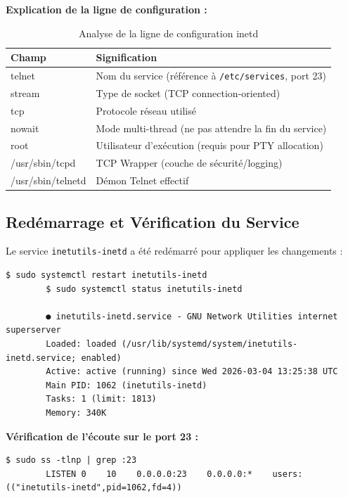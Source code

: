 \documentclass[12pt,a4paper,openany]{report}
\newcommand{\tableheadcolor}{\rowcolor{tableheadbg}}
\begin{document}
	\textbf{Explication de la ligne de configuration :}
	\begin{table}[H]
		\centering
		\small
		\renewcommand{\arraystretch}{1.4}
		\begin{tabular}{>{\ttfamily}p{3cm} p{10cm}}
			\arrayrulecolor{tableborder}
			\hline
			\tableheadcolor
			\textcolor{tableheadfg}{\textbf{Champ}} &
			\textcolor{tableheadfg}{\textbf{Signification}} \\
			\hline
			\rowcolor{tablerowalt}
			telnet & Nom du service (référence à \texttt{/etc/services}, port 23) \\
			stream & Type de socket (TCP connection-oriented) \\
			\rowcolor{tablerowalt}
			tcp & Protocole réseau utilisé \\
			nowait & Mode multi-thread (ne pas attendre la fin du service) \\
			\rowcolor{tablerowalt}
			root & Utilisateur d'exécution (requis pour PTY allocation) \\
			/usr/sbin/tcpd & TCP Wrapper (couche de sécurité/logging) \\
			\rowcolor{tablerowalt}
			/usr/sbin/telnetd & Démon Telnet effectif \\
			\hline
		\end{tabular}
		\caption{Analyse de la ligne de configuration inetd}
	\end{table}
	
	\subsection{Redémarrage et Vérification du Service}
	Le service \texttt{inetutils-inetd} a été redémarré pour appliquer les changements :
	
	\begin{lstlisting}[caption=Redémarrage du service inetd]
		$ sudo systemctl restart inetutils-inetd
		$ sudo systemctl status inetutils-inetd
		
		● inetutils-inetd.service - GNU Network Utilities internet superserver
		Loaded: loaded (/usr/lib/systemd/system/inetutils-inetd.service; enabled)
		Active: active (running) since Wed 2026-03-04 13:25:38 UTC
		Main PID: 1062 (inetutils-inetd)
		Tasks: 1 (limit: 1813)
		Memory: 340K
	\end{lstlisting}
	
	\textbf{Vérification de l'écoute sur le port 23 :}
	\begin{lstlisting}[caption=Vérification du port Telnet]
		$ sudo ss -tlnp | grep :23
		LISTEN 0    10    0.0.0.0:23    0.0.0.0:*    users:(("inetutils-inetd",pid=1062,fd=4))
	\end{lstlisting}
	
\end{document}
